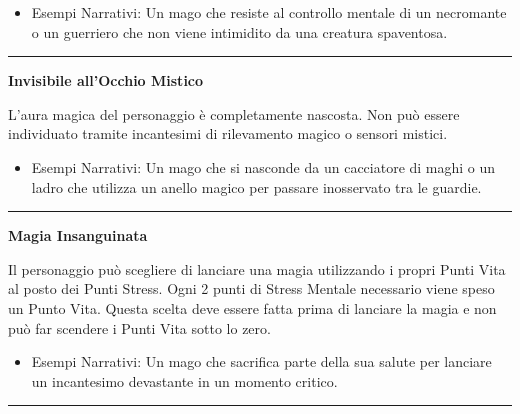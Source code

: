 \documentclass[../manuale_main.tex]{subfiles}
\begin{document}
\begin{itemize}
\item Esempi Narrativi: Un mago che resiste al controllo mentale di un necromante o un guerriero che non viene intimidito da una creatura spaventosa.
\end{itemize}

\vspace{0.5cm}
\noindent
\begin{center}
\rule{\textwidth}{0.4pt} 
\end{center}
\vspace{0.5cm}

\begin{center}
\textbf{\large{Invisibile all'Occhio Mistico}}\\
\end{center}
L'aura magica del personaggio è completamente nascosta. Non può essere individuato tramite incantesimi di rilevamento magico o sensori mistici.

\begin{itemize}
\item Esempi Narrativi: Un mago che si nasconde da un cacciatore di maghi o un ladro che utilizza un anello magico per passare inosservato tra le guardie.
\end{itemize}

\vspace{0.5cm}
\noindent
\begin{center}
\rule{\textwidth}{0.4pt} 
\end{center}
\vspace{0.5cm}

\begin{center}
\textbf{\large{Magia Insanguinata}}\\
\end{center}
Il personaggio può scegliere di lanciare una magia utilizzando i propri Punti Vita al posto dei Punti Stress. Ogni 2 punti di Stress Mentale necessario viene speso un Punto Vita. Questa scelta deve essere fatta prima di lanciare la magia e non può far scendere i Punti Vita sotto lo zero.

\begin{itemize}
\item Esempi Narrativi: Un mago che sacrifica parte della sua salute per lanciare un incantesimo devastante in un momento critico.
\end{itemize}

\vspace{0.5cm}
\noindent
\begin{center}
\rule{\textwidth}{0.4pt} 
\end{center}
\vspace{0.5cm}
\end{document}
